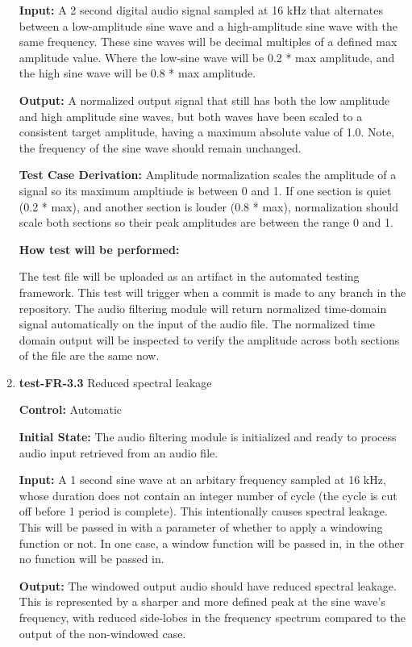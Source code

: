 \documentclass[12pt, titlepage]{article}
\begin{document}
\begin{enumerate}
\textbf{Input:}
A 2 second digital audio signal sampled at 16 kHz that alternates between a 
low-amplitude sine wave and a high-amplitude sine wave with the same frequency. 
These sine waves will be decimal multiples of a defined max amplitude value. 
Where the low-sine wave will be 0.2 * max amplitude, and the high sine wave will
 be 0.8 * max amplitude. 
					
\textbf{Output:}
A normalized output signal that still has both the low amplitude and high 
amplitude sine waves, but both waves have been scaled to a consistent target 
amplitude, having a maximum absolute value of 1.0. Note, the frequency of the 
sine wave should remain unchanged. 

\textbf{Test Case Derivation:} 
Amplitude normalization scales the amplitude of a signal so its maximum 
ampltiude is between 0 and 1. If one section is quiet (0.2 * max), and 
another section is louder (0.8 * max), normalization should scale both sections 
so their peak amplitudes are between the range 0 and 1. 
					
\textbf{How test will be performed:}

The test file will be uploaded as an artifact in the automated testing 
framework. This test will trigger when a commit is made to any branch in the 
repository. The audio filtering module will return normalized time-domain 
signal automatically on the input of the audio file. The normalized time 
domain output will be inspected to verify the amplitude across both sections of 
the file are the same now.

\item{\textbf{test-FR-3.3} Reduced spectral leakage\\}

\textbf{Control:} Automatic
					
\textbf{Initial State:} 
The audio filtering module is initialized and ready to process audio input 
retrieved from an audio file. 
					
\textbf{Input:}
A 1 second sine wave at an arbitary frequency sampled at 16 kHz, whose duration 
does not contain an integer number of cycle (the cycle is cut off before 1 
period is complete). This intentionally causes spectral leakage. This will be 
passed in with a parameter of whether to apply a windowing function or not. 
In one case, a window function will be passed in, in the other no function
will be passed in.
					
\textbf{Output:}
The windowed output audio should have reduced spectral leakage. This is 
represented by a sharper and more defined peak at the sine wave's frequency,
with reduced side-lobes in the frequency spectrum compared to the output of the 
non-windowed case. 


\end{enumerate}
\end{document}
